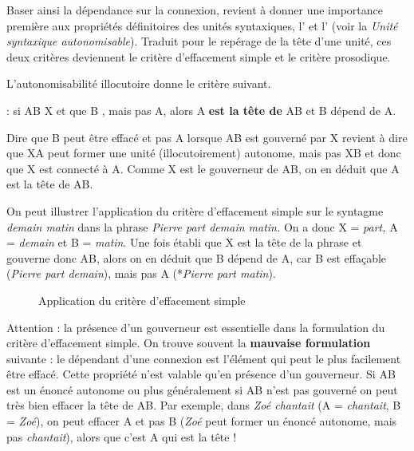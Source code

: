 Baser ainsi la dépendance sur la connexion, revient à donner une importance première aux propriétés définitoires des unités syntaxiques, l’ et l’ (voir la  \textit{Unité syntaxique autonomisable}). Traduit pour le repérage de la tête d’une unité, ces deux critères deviennent le critère d’effacement simple et le critère prosodique.

L’autonomisabilité illocutoire donne le critère suivant.

{ : si  AB  X et que B , mais pas A, alors A \textbf{est la tête de} AB et B dépend de A.}

Dire que B peut être effacé et pas A lorsque AB est gouverné par X revient à dire que XA peut former une unité (illocutoirement) autonome, mais pas XB et donc que X est connecté à A. Comme X est le gouverneur de AB, on en déduit que A est la tête de AB.

On peut illustrer l'application du critère d'effacement simple sur le syntagme \textit{demain matin} dans la phrase \textit{Pierre part demain matin.}
On a donc X = \textit{part,} A = \textit{demain} et B = \textit{matin}. Une fois établi que X est la tête de la phrase et gouverne donc AB, alors on en déduit que B dépend de A, car B est effaçable (\textit{Pierre part demain}), mais pas A (*\textit{Pierre part matin}).

\begin{figure}
\caption{\label{fig:}Application du critère d’effacement simple}
\end{figure}

Attention : la présence d’un gouverneur est essentielle dans la formulation du  critère d’effacement simple. On trouve souvent la \textbf{mauvaise formulation} suivante : le dépendant d’une connexion est l’élément qui peut le plus facilement être effacé. Cette propriété n’est valable qu’en présence d’un gouverneur. Si AB est un énoncé autonome ou plus généralement si AB n’est pas gouverné on peut très bien effacer la tête de AB. Par exemple, dans \textit{Zoé chantait} (A = \textit{chantait}, B = \textit{Zoé}), on peut effacer A et pas B (\textit{Zoé} peut former un énoncé autonome, mais pas \textit{chantait}), alors que c’est A qui est la tête !

